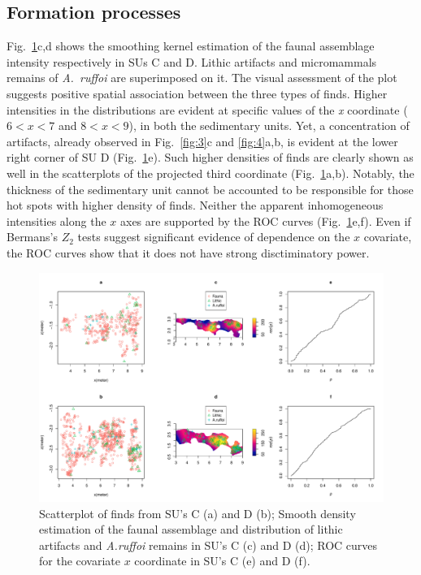 \documentclass[review,authoryear]{elsarticle} %
\begin{document}
\subsection{Formation processes}

Fig.~\ref{fig:5}c,d shows the smoothing kernel estimation of the faunal assemblage intensity respectively in SUs C and D. Lithic artifacts and micromammals remains of \emph{A.~ruffoi} are superimposed on it. The visual assessment of the plot suggests positive spatial association between the three types of finds. Higher intensities in the distributions are evident at specific values of the \emph{x} coordinate ($6<x<7$ and $8<x<9$), in both the sedimentary units. Yet, a concentration of artifacts, already observed in Fig.~\ref{fig:3}c and \ref{fig:4}a,b, is evident at the lower right corner of SU D (Fig.~\ref{fig:5}e). Such higher densities of finds are clearly shown as well in the scatterplots of the projected third coordinate (Fig.~\ref{fig:5}a,b). Notably, the thickness of the sedimentary unit cannot be accounted to be responsible for those hot spots with higher density of finds. Neither the apparent inhomogeneous intensities along the $x$ axes are supported by the ROC curves (Fig.~\ref{fig:5}e,f). Even if Bermans's $Z_2$ tests suggest significant evidence of dependence on the $x$ covariate, the ROC curves show that it does not have strong disctiminatory power.

\begin{figure}
  \centering
  \includegraphics[width=1\textwidth]{../artwork/Fig5.pdf}
  \caption{Scatterplot of finds from SU's C (a) and D (b); Smooth density estimation of the faunal assemblage and distribution of lithic artifacts and \emph{A.ruffoi} remains in SU's C (c) and D (d); ROC curves for the covariate $x$ coordinate in SU's C (e) and D (f).}
  \label{fig:5}
\end{figure}
\end{document}
